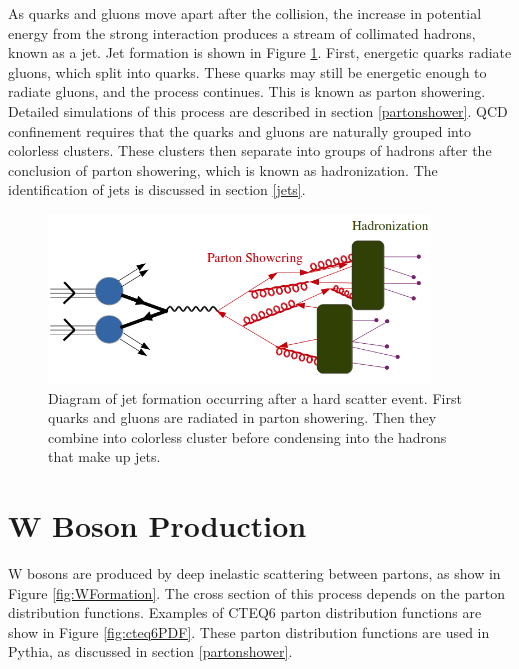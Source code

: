 \documentclass[oneside, letterpaper, oldfontcommands]{memoir}
\begin{document}
\qquad As quarks and gluons move apart after the collision, the increase in potential energy from the strong interaction produces a stream of collimated hadrons, known as a jet. Jet formation is shown in Figure \ref{fig:JetFormation}. First, energetic quarks radiate gluons, which split into quarks. These quarks may still be energetic enough to radiate gluons, and the process continues. This is known as parton showering. Detailed simulations of this process are described in section \ref{partonshower}. QCD confinement requires that the quarks and gluons are naturally grouped into colorless clusters. These clusters then separate into groups of hadrons after the conclusion of parton showering, which is known as hadronization. The identification of jets is discussed in section \ref{jets}. 

\begin{figure}[here]
\includegraphics[width=0.9\textwidth]{jetformation.png}
\caption{Diagram of jet formation occurring after a hard scatter event. First quarks and gluons are radiated in parton showering. Then they combine into colorless cluster before condensing into the hadrons that make up jets.}
\label{fig:JetFormation}
\end{figure}



\section{W Boson Production}\label{wboson}
\qquad W bosons are produced by deep inelastic scattering between partons, as show in Figure \ref{fig:WFormation}. The cross section of this process depends on the parton distribution functions. Examples of CTEQ6 parton distribution functions are show in Figure \ref{fig:cteq6PDF}\cite{Pumplin:2002vw}. These parton distribution functions are used in {\sc Pythia}, as discussed in section \ref{partonshower}.
\end{document}
